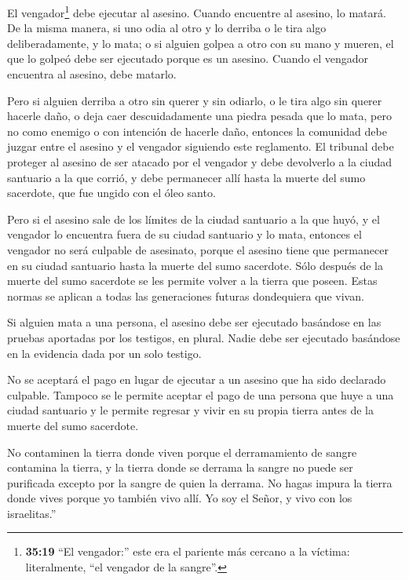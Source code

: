  El vengador\footnote{\textbf{35:19} ``El vengador:'' este
  era el pariente más cercano a la víctima: literalmente, ``el vengador
  de la sangre''.} debe ejecutar al asesino. Cuando encuentre al
asesino, lo matará.  De la misma manera, si uno odia al
otro y lo derriba o le tira algo deliberadamente, y lo mata;
 o si alguien golpea a otro con su mano y mueren, el que lo
golpeó debe ser ejecutado porque es un asesino. Cuando el vengador
encuentra al asesino, debe matarlo.

 Pero si alguien derriba a otro sin querer y sin odiarlo, o
le tira algo sin querer hacerle daño,  o deja caer
descuidadamente una piedra pesada que lo mata, pero no como enemigo o
con intención de hacerle daño,  entonces la comunidad debe
juzgar entre el asesino y el vengador siguiendo este reglamento.
 El tribunal debe proteger al asesino de ser atacado por el
vengador y debe devolverlo a la ciudad santuario a la que corrió, y debe
permanecer allí hasta la muerte del sumo sacerdote, que fue ungido con
el óleo santo.

 Pero si el asesino sale de los límites de la ciudad
santuario a la que huyó,  y el vengador lo encuentra fuera
de su ciudad santuario y lo mata, entonces el vengador no será culpable
de asesinato,  porque el asesino tiene que permanecer en su
ciudad santuario hasta la muerte del sumo sacerdote. Sólo después de la
muerte del sumo sacerdote se les permite volver a la tierra que poseen.
 Estas normas se aplican a todas las generaciones futuras
dondequiera que vivan.

 Si alguien mata a una persona, el asesino debe ser
ejecutado basándose en las pruebas aportadas por los testigos, en
plural. Nadie debe ser ejecutado basándose en la evidencia dada por un
solo testigo.

 No se aceptará el pago en lugar de ejecutar a un asesino
que ha sido declarado culpable.  Tampoco se le permite
aceptar el pago de una persona que huye a una ciudad santuario y le
permite regresar y vivir en su propia tierra antes de la muerte del sumo
sacerdote.

 No contaminen la tierra donde viven porque el
derramamiento de sangre contamina la tierra, y la tierra donde se
derrama la sangre no puede ser purificada excepto por la sangre de quien
la derrama.  No hagas impura la tierra donde vives porque
yo también vivo allí. Yo soy el Señor, y vivo con los israelitas.''

